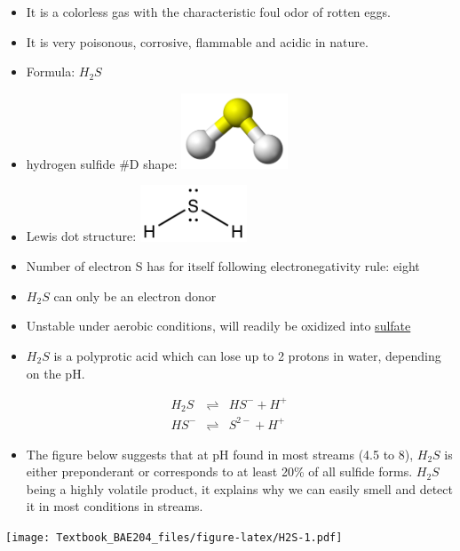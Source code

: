 \documentclass[]{book}
\providecommand{\tightlist}{%
  \setlength{\itemsep}{0pt}\setlength{\parskip}{0pt}}
\theoremstyle{definition}
\theoremstyle{definition}
\theoremstyle{definition}
\theoremstyle{remark}
\begin{document}
\begin{itemize}
\tightlist
\item
  It is a colorless gas with the characteristic foul odor of rotten
  eggs.
\item
  It is very poisonous, corrosive, flammable and acidic in nature.
\item
  Formula: \(H_2S\)
\item
  hydrogen sulfide \#D shape:
  \includegraphics[width=0.25000\textwidth]{pictures/Hydrogen-sulfide-3D-balls.png}
\item
  Lewis dot structure:
  \includegraphics[width=0.25000\textwidth]{pictures/H2S_Lewis_structure.png}
\item
  Number of electron S has for itself following electronegativity rule:
  eight
\item
  \(H_2S\) can only be an electron donor
\item
  Unstable under aerobic conditions, will readily be oxidized into
  \protect\hyperlink{SO4}{sulfate}
\item
  \(H_2S\) is a polyprotic acid which can lose up to 2 protons in water,
  depending on the pH.
\end{itemize}

\begin{align}
H_2S & \rightleftharpoons & HS^- + H^+ \label{eq:H2S} \\
HS^- & \rightleftharpoons & S^{2-}+ H^+ \label{eq:HS} 
\end{align}

\begin{itemize}
\tightlist
\item
  The figure below suggests that at pH found in most streams (4.5 to 8),
  \(H_2S\) is either preponderant or corresponds to at least 20\% of all
  sulfide forms. \(H_2S\) being a highly volatile product, it explains
  why we can easily smell and detect it in most conditions in streams.
\end{itemize}

\texttt{[image: Textbook\_BAE204\_files/figure-latex/H2S-1.pdf]}
\end{document}

